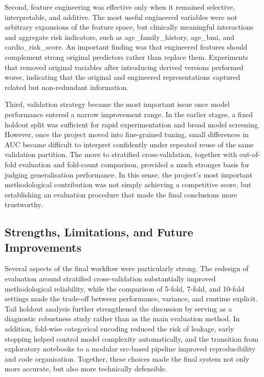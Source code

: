 \documentclass[a4paper,11pt]{article}
\begin{document}
Second, feature engineering was effective only when it remained selective, interpretable, and additive. The most useful engineered variables were not arbitrary expansions of the feature space, but clinically meaningful interactions and aggregate risk indicators, such as age\_family\_history, age\_bmi, and cardio\_risk\_score. An important finding was that engineered features should complement strong original predictors rather than replace them. Experiments that removed original variables after introducing derived versions performed worse, indicating that the original and engineered representations captured related but non-redundant information.

Third, validation strategy became the most important issue once model performance entered a narrow improvement range. In the earlier stages, a fixed holdout split was sufficient for rapid experimentation and broad model screening. However, once the project moved into fine-grained tuning, small differences in AUC became difficult to interpret confidently under repeated reuse of the same validation partition. The move to stratified cross-validation, together with out-of-fold evaluation and fold-count comparison, provided a much stronger basis for judging generalisation performance. In this sense, the project's most important methodological contribution was not simply achieving a competitive score, but establishing an evaluation procedure that made the final conclusions more trustworthy.

\subsection{Strengths, Limitations, and Future Improvements}

Several aspects of the final workflow were particularly strong. The redesign of evaluation around stratified cross-validation substantially improved methodological reliability, while the comparison of 5-fold, 7-fold, and 10-fold settings made the trade-off between performance, variance, and runtime explicit. Tail holdout analysis further strengthened the discussion by serving as a diagnostic robustness study rather than as the main evaluation method. In addition, fold-wise categorical encoding reduced the risk of leakage, early stopping helped control model complexity automatically, and the transition from exploratory notebooks to a modular src-based pipeline improved reproducibility and code organisation. Together, these choices made the final system not only more accurate, but also more technically defensible.
\end{document}
